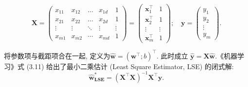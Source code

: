 \documentclass[a4paper,UTF8]{article}
\numberwithin{equation}{section}
\theoremstyle{definition}
\def \X {\mathbf{X}}
\def \w {\hat{\boldsymbol{w}}}
\def \y {\mathbf{y}}
\def \x {\mathbf{x}}
\begin{document}
	\[
	\X=\left(\begin{array}{ccccc}
		x_{11} & x_{12} & \ldots & x_{1 d} & 1 \\
		x_{21} & x_{22} & \ldots & x_{2 d} & 1 \\
		\vdots & \vdots & \ddots & \vdots & \vdots \\
		x_{m 1} & x_{m 2} & \cdots & x_{m d} & 1
	\end{array}\right)
	=
	\left(\begin{array}{cc}
		\x_1^{\top} & 1 \\
		\x_2^{\top} & 1 \\
		\vdots & \vdots \\
		\x_m^{\top} & 1
	\end{array}\right)
	;\quad \y 
	=
	\left(\begin{array}{c}
		y_1\\
		y_2\\
		\vdots\\
		y_m
	\end{array}\right).
	\]
	
	将参数项与截距项合在一起, 定义为$\w=
	\left(
	\boldsymbol{w}^\top; b\right)^\top$. 此时成立 $\hat{\y} = \X\w$.《机器学习》式 (3.11) 给出了最小二乘估计 (Least Square Estimator, LSE) 的闭式解: 
	\begin{equation}
		\label{eq:LSE}
		\w_{\textbf{LSE}}^* = \left(\X^\top\X\right)^{-1}\X^\top\y.
	\end{equation}
	
\end{document}
